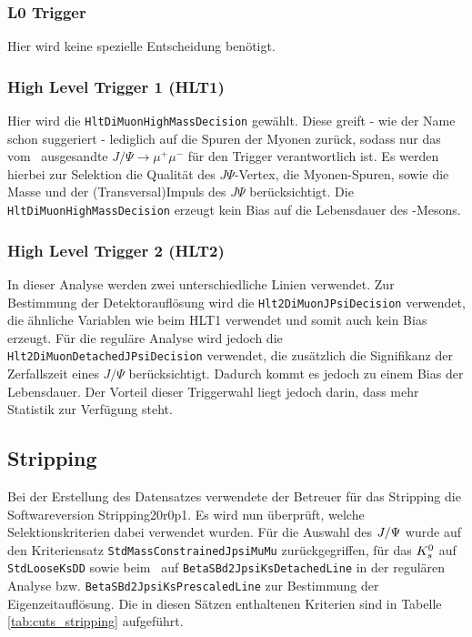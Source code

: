 \subsubsection{L0 Trigger}
Hier wird keine spezielle Entscheidung benötigt.

\subsubsection{High Level Trigger 1 (HLT1)}
Hier wird die \texttt{HltDiMuonHighMassDecision} gewählt. Diese greift - wie der Name schon suggeriert - lediglich auf die Spuren der Myonen zurück, sodass nur das vom \Bd\ ausgesandte $J/\Psi \rightarrow \mu^+\mu^-$ für den Trigger verantwortlich ist. Es werden hierbei zur Selektion die Qualität des $J\Psi$-Vertex, die Myonen-Spuren, sowie die Masse und der (Transversal)Impuls des $J\Psi$ berücksichtigt. Die \texttt{HltDiMuonHighMassDecision} erzeugt kein Bias auf die Lebensdauer des \Bd-Mesons.

\subsubsection{High Level Trigger 2 (HLT2)}
In dieser Analyse werden zwei unterschiedliche Linien verwendet. Zur Bestimmung der Detektorauflösung wird die \texttt{Hlt2DiMuonJPsiDecision} verwendet, die ähnliche Variablen wie beim HLT1 verwendet und somit auch kein Bias erzeugt. Für die reguläre Analyse wird jedoch die \texttt{Hlt2DiMuonDetachedJPsiDecision} verwendet, die zusätzlich die Signifikanz der Zerfallszeit eines $J/\Psi$ berücksichtigt. Dadurch kommt es jedoch zu einem Bias der Lebensdauer. Der Vorteil dieser Triggerwahl liegt jedoch darin, dass mehr Statistik zur Verfügung steht.



\subsection{Stripping} \label{kap:stripping}
Bei der Erstellung des Datensatzes verwendete der Betreuer für das Stripping die Softwareversion Stripping20r0p1. Es wird nun überprüft, welche Selektionskriterien dabei verwendet wurden. Für die Auswahl des $J/\Psi$ wurde auf den Kriteriensatz \texttt{Std\-Mass\-Constrained\-Jpsi\-MuMu} zurückgegriffen, für das $K_s^0$ auf \texttt{StdLooseKsDD} sowie beim \Bd\ auf \texttt{Beta\-SBd2\-JpsiKs\-De\-tached\-Line} in der regulären Analyse bzw. \texttt{Beta\-SBd2\-JpsiKs\-Pre\-scaled\-Line} zur Bestimmung der Eigenzeitauflösung. Die in diesen Sätzen enthaltenen Kriterien sind in Tabelle \ref{tab:cuts_stripping} aufgeführt.

